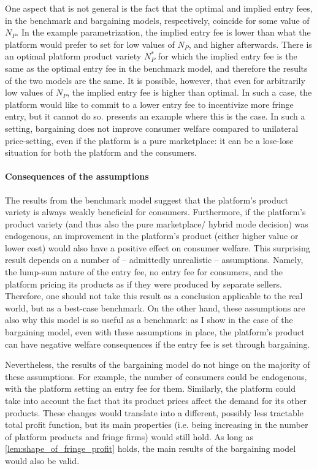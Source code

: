 \documentclass[a4paper]{article}
\begin{document}
One aspect that is not general is the fact that the optimal and implied entry fees, in the benchmark and bargaining models, respectively, coincide for some value of $N_P$.
In the example parametrization, the implied entry fee is lower than what the platform would prefer to set for low values of $N_P$, and higher afterwards.
There is an optimal platform product variety $N_P^*$ for which the implied entry fee is the same as the optimal entry fee in the benchmark model, and therefore the results of the two models are the same.
It is possible, however, that even for arbitrarily low values of $N_P$, the implied entry fee is higher than optimal.
In such a case, the platform would like to commit to a lower entry fee to incentivize more fringe entry, but it cannot do so.
 presents an example where this is the case.
In such a setting, bargaining does not improve consumer welfare compared to unilateral price-setting, even if the platform is a pure marketplace: it can be a lose-lose situation for both the platform and the consumers.


\paragraph{Consequences of the assumptions}
The results from the benchmark model suggest that the platform's product variety is always weakly beneficial for consumers.
Furthermore, if the platform's product variety (and thus also the pure marketplace/ hybrid mode decision) was endogenous, an improvement in the platform's product (either higher value or lower cost) would also have a positive effect on consumer welfare.
This surprising result depends on a number of -- admittedly unrealistic -- assumptions.
Namely, the lump-sum nature of the entry fee, no entry fee for consumers, and the platform pricing its products as if they were produced by separate sellers.
Therefore, one should not take this result as a conclusion applicable to the real world, but as a best-case benchmark.
On the other hand, these assumptions are also why this model is so useful as a benchmark: as I show in the case of the bargaining model, even with these assumptions in place, the platform's product can have negative welfare consequences if the entry fee is set through bargaining.

Nevertheless, the results of the bargaining model do not hinge on the majority of these assumptions.
For example, the number of consumers could be endogenous, with the platform setting an entry fee for them.
Similarly, the platform could take into account the fact that its product prices affect the demand for its other products.
These changes would translate into a different, possibly less tractable total profit function, but its main properties (i.e. being increasing in the number of platform products and fringe firms) would still hold.
As long as \cref{lem:shape_of_fringe_profit} holds, the main results of the bargaining model would also be valid.
\end{document}
